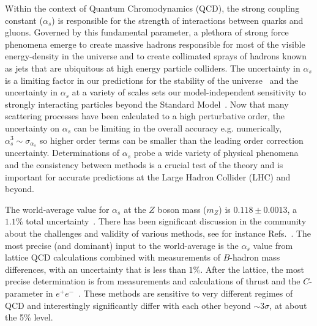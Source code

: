 



Within the context of Quantum Chromodynamics (QCD), the strong coupling constant ($\alpha_s$) is responsible for the strength of interactions between quarks and gluons.  Governed by this fundamental parameter, a plethora of strong force phenomena emerge to create massive hadrons responsible for most of the visible energy-density in the universe and to create collimated sprays of hadrons known as jets that are ubiquitous at high energy particle colliders.  The uncertainty in $\alpha_s$ is a limiting factor in our predictions for the stability of the universe~\cite{Andreassen:2017rzq} and the uncertainty in $\alpha_s$ at a variety of scales sets our model-independent sensitivity to strongly interacting particles beyond the Standard Model~\cite{Kaplan:2008pt,Becciolini:2014lya}.   Now that many scattering processes have been calculated to a high perturbative order, the uncertainty on $\alpha_s$ can be limiting in the overall accuracy e.g. numerically, $\alpha_s^3\sim \sigma_{\alpha_s}$ so higher order terms can be smaller than the leading order correction uncertainty.  Determinations of $\alpha_s$ probe a wide variety of physical phenomena and the consistency between methods is a crucial test of the theory and is important for accurate predictions at the Large Hadron Collider (LHC) and beyond.  


The world-average value for $\alpha_s$ at the $Z$ boson mass ($m_Z$) is $0.118\pm 0.0013$, a $1.1\%$ total uncertainty~\cite{Olive:2016xmw}.  There has been significant discussion in the community about the challenges and validity of various methods, see for instance Refs.~\cite{Bethke:2011tr,Pich:2013sqa,Moch:2014tta,dEnterria:2015kmd,Olive:2016xmw,Salam:2017qdl,Altarelli:2013bpa}.  The most precise (and dominant) input to the world-average is the $\alpha_s$ value from lattice QCD calculations combined with measurements of $B$-hadron mass differences, with an uncertainty that is less than $1\%$.   After the lattice, the most precise determination is from measurements and calculations of thrust and the $C$-parameter in $e^+e^-$~\cite{Abbate:2010xh,Hoang:2015hka,Heister:2003aj,Abdallah:2004xe,Abreu:1996mk,Abreu:1999rc,Biebel:1999zt,Adeva:1992gv,Abbiendi:2004qz,Abe:1994mf}.   These methods are sensitive to very different regimes of QCD and interestingly significantly differ with each other beyond $\sim 3\sigma$, at about the 5\% level.  

